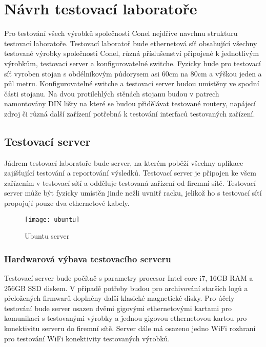 \chapter{Návrh testovací laboratoře}
Pro testování všech výrobků společnosti Conel nejdříve navrhnu strukturu testovací laboratoře. Testovací laboratoř bude ethernetová síť obsahující všechny testované výrobky společnosti Conel, různá příslušenství připojené k jednotlivým výrobkům, testovací server a konfigurovatelné switche. Fyzicky bude pro testovací síť vyroben stojan s obdélníkovým půdorysem asi 60cm na 80cm a výškou jeden a půl metru. Konfigurovatelné switche a testovací server budou umístěny ve spodní části stojanu. Na dvou protilehlých stěnách stojanu budou v patrech namontovány DIN lišty na které se budou přidělávat testované routery, napájecí zdroj či různá další zařízení potřebná k testování interfaců testovaných zařízení.

\section{Testovací server}
Jádrem testovací laboratoře bude server, na kterém poběží všechny aplikace zajišťující testování a reportování výsledků. Testovací server je připojen ke všem zařízením v testovací sítí a odděluje testovaná zařízení od firemní sítě. Testovací server může být fyzicky umístěn jinde nežli uvnitř racku, jelikož ho s testovací sítí propojují pouze dva ethernetové kabely.

\begin{figure}[h]
  \centering
  \texttt{[image: ubuntu]}
  \caption{Ubuntu server}
  \label{fig:ubuntu}
\end{figure}

\subsection{Hardwarová výbava testovacího serveru}
Testovací server bude počítač s parametry procesor Intel core i7, 16GB RAM a 256GB SSD diskem. V případě potřeby budou pro archivování starších logů a přeložených firmwarů doplněny další klasické magnetické disky. Pro účely testování bude server osazen dvěmi gigovými ethernetovými kartami pro komunikaci s testovanými výrobky a jednou gigovou ethernetovou kartou pro konektivitu serveru do firemní sítě. Server dále má osazeno jedno WiFi rozhraní pro testování WiFi konektivity testovaných výrobků.

